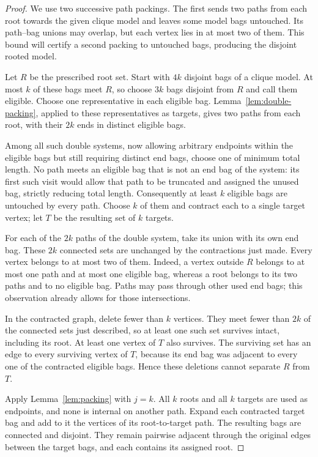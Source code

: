 \begin{proof}
We use two successive path packings. The first sends two paths from each
root towards the given clique model and leaves some model bags untouched.
Its path--bag unions may overlap, but each vertex lies in at most two of
them. This bound will certify a second packing to untouched bags, producing
the disjoint rooted model.

Let $R$ be the prescribed root set.  Start with $4k$ disjoint bags of a
clique model.  At most $k$ of these bags meet $R$, so choose $3k$ bags
disjoint from $R$ and call them eligible.  Choose one representative in
each eligible bag.  Lemma~\ref{lem:double-packing}, applied to these
representatives as targets, gives two paths from each root, with their
$2k$ ends in distinct eligible bags.

Among all such double systems, now allowing arbitrary endpoints within
the eligible bags but still requiring distinct end bags, choose one of
minimum total length.  No path meets an eligible bag that is not an end
bag of the system: its first such visit would allow that path to be
truncated and assigned the unused bag, strictly reducing total length.
Consequently at least $k$ eligible bags are untouched by every path.
Choose $k$ of them and contract each to a single target vertex; let $T$
be the resulting set of $k$ targets.

For each of the $2k$ paths of the double system, take its union with its
own end bag.  These $2k$ connected sets are unchanged by the contractions
just made.  Every vertex belongs to at most two of them.  Indeed, a
vertex outside $R$ belongs to at most one path and at most one eligible
bag, whereas a root belongs to its two paths and to no eligible bag.
Paths may pass through other used end bags; this observation already
allows for those intersections.

In the contracted graph, delete fewer than $k$ vertices.  They meet
fewer than $2k$ of the connected sets just described, so at least one
such set survives intact, including its root.  At least one vertex of
$T$ also survives.  The surviving set has an edge to every surviving
vertex of $T$, because its end bag was adjacent to every one of the
contracted eligible bags.  Hence these deletions cannot separate $R$
from $T$.

Apply Lemma~\ref{lem:packing} with $j=k$.  All $k$ roots and all $k$
targets are used as endpoints, and none is internal on another path.
Expand each contracted target bag and add to it the vertices of its
root-to-target path.  The resulting bags are connected and disjoint.
They remain pairwise adjacent through the original edges between the
target bags, and each contains its assigned root.
\end{proof}

